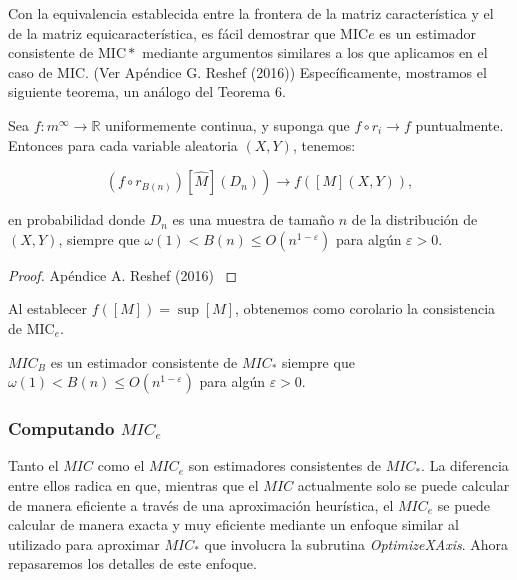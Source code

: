     
        Con la equivalencia establecida entre la frontera de la matriz caracter\'istica y el de la matriz equicaracter\'istica, es f\'acil demostrar que $\mathrm{MIC}e$ es un estimador consistente de $\mathrm{MIC}*$ mediante argumentos similares a los que aplicamos en el caso de MIC. (Ver Ap\'endice G. Reshef (2016)\cite{Reshef2016}) Espec\'ificamente, mostramos el siguiente teorema, un an\'alogo del Teorema 6.
        
        \begin{thm}
            Sea $f: m^{\infty} \rightarrow \mathbb{R}$ uniformemente continua, y suponga que $f \circ r_i \rightarrow f$ puntualmente. Entonces para cada variable aleatoria $(X, Y)$, tenemos:
    
            $$
            \left.\left(f \circ r_{B(n)}\right)[\widehat{M}]\left(D_n\right)\right) \rightarrow f([M](X, Y)),
            $$
    
            en probabilidad donde $D_n$ es una muestra de tama\~no $n$ de la distribuci\'on de $(X, Y)$, siempre que $\omega(1)<B(n) \leq O\left(n^{1-\varepsilon}\right)$ para alg\'un $\varepsilon>0$.
        \end{thm}
        \begin{proof}
            Ap\'endice A. Reshef (2016) \cite{Reshef2016}
        \end{proof}
    
        Al establecer $f([M])=\sup [M]$, obtenemos como corolario la consistencia de $\mathrm{MIC}_e$.
        
        \begin{cor}
            $M I C_{B}$ es un estimador consistente de $M I C_*$ siempre que $\omega(1)<B(n) \leq O\left(n^{1-\varepsilon}\right)$ para alg\'un $\varepsilon>0$.
        \end{cor}
    
        \subsubsection[computando mic e ]{Computando $MIC_e$}
    
        Tanto el $MIC$ como el $MIC_e$ son estimadores consistentes de $MIC_*$. La diferencia entre ellos radica en que, mientras que el $MIC$ actualmente solo se puede calcular de manera eficiente a trav\'es de una aproximaci\'on heur\'istica, el $MIC_e$ se puede calcular de manera exacta y muy eficiente mediante un enfoque similar al utilizado para aproximar $MIC_*$ que involucra la subrutina \textit{OptimizeXAxis}. Ahora repasaremos los detalles de este enfoque.
    
